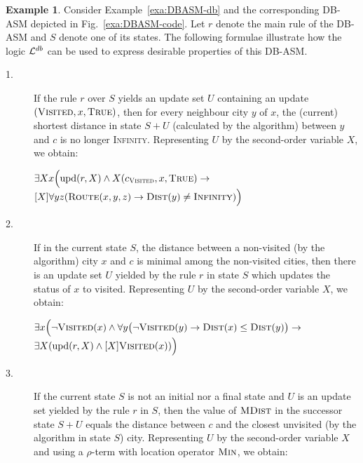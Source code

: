 \documentclass[preprint,11pt]{elsarticle}
\theoremstyle{definition}
\newtheorem{example}{Example}[section]
\theoremstyle{remark}
\begin{document}
\begin{example}\label{exa:syntaxformulae}
Consider Example~\ref{exa:DBASM-db} and the corresponding DB-ASM depicted in Fig.~\ref{exa:DBASM-code}. Let $r$ denote the main rule of the DB-ASM and $S$ denote one of its states.
The following formulae illustrate how the logic ${\cal L}^{db}$ can be used to express desirable properties of this DB-ASM. 

\begin{description}

\item [1.] If the rule $r$ over $S$ yields an update set $U$ containing an update $(\textsc{Visited}, x, \textsc{True})$, then for every neighbour city $y$ of $x$, the (current) shortest distance in state $S+U$ (calculated by the algorithm) between $y$ and $c$ is no longer \textsc{Infinity}. Representing $U$ by the second-order variable $X$, we obtain:

$\exists X x \Big(\mathrm{upd}(r,X)\wedge X(c_{\textsc{Visited}}, x, \textsc{True}) \rightarrow$ \\
\hspace*{5cm}$[X] \forall y z (\textsc{Route}(x,y,z) \rightarrow \textsc{Dist}(y) \neq \textsc{Infinity})\Big)$\\[0.1cm]

\item [2.] If in the current state $S$, the distance between a non-visited (by the algorithm) city $x$ and $c$ is minimal among the non-visited cities, then there is an update set $U$ yielded by the rule $r$ in state $S$ which updates the status of $x$ to visited. Representing $U$ by the second-order variable $X$, we obtain:

$\exists x \Big(\neg \textsc{Visited}(x) \wedge \forall y \big(\neg \textsc{Visited}(y) \rightarrow \textsc{Dist}(x) \leq \textsc{Dist}(y)\big) \rightarrow$ \\
\hspace*{7.5cm}$\exists X (\mathrm{upd}(r, X) \wedge [X] \textsc{Visited}(x))\Big)$\\[0.1cm]

\item [3.] If the current state $S$ is not an initial nor a final state and $U$ is an update set yielded by the rule $r$ in $S$, then the value of $\textsc{MDist}$ in the successor state $S+U$ equals the distance between $c$ and the closest unvisited (by the algorithm in state $S$) city. Representing $U$ by the second-order variable $X$ and using a $\rho$-term with location operator $\textsc{Min}$, we obtain:


\end{description}
\end{example}
\end{document}

